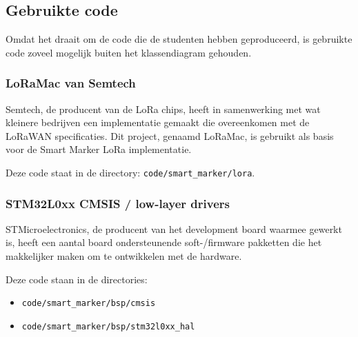 \subsection{Gebruikte code}
Omdat het draait om de code die de studenten hebben geproduceerd, is gebruikte
code zoveel mogelijk buiten het klassendiagram gehouden.

\subsubsection{LoRaMac van Semtech}
Semtech, de producent van de LoRa chips, heeft in samenwerking met wat kleinere
bedrijven een implementatie gemaakt die overeenkomen met de LoRaWAN specificaties.
Dit project, genaamd LoRaMac, is gebruikt als basis voor de Smart Marker LoRa
implementatie.

Deze code staat in de directory: \texttt{code/smart\_marker/lora}.

\subsubsection{STM32L0xx CMSIS / low-layer drivers}
STMicroelectronics, de producent van het development board waarmee gewerkt is,
heeft een aantal board ondersteunende soft-/firmware pakketten die het makkelijker
maken om te ontwikkelen met de hardware.

Deze code staan in de directories:
\begin{itemize}
    \item \texttt{code/smart\_marker/bsp/cmsis}
    \item \texttt{code/smart\_marker/bsp/stm32l0xx\_hal}
\end{itemize}